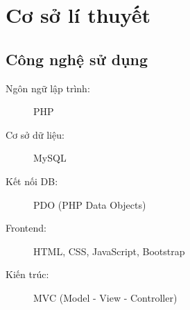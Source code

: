 
\section{Cơ sở lí thuyết}
\subsection{Công nghệ sử dụng}
\begin{description}
    \item[Ngôn ngữ lập trình:] PHP
    \item[Cơ sở dữ liệu:] MySQL
    \item[Kết nối DB:] PDO (PHP Data Objects)
    \item[Frontend:] HTML, CSS, JavaScript, Bootstrap
    \item[Kiến trúc:] MVC (Model - View - Controller)
\end{description}

